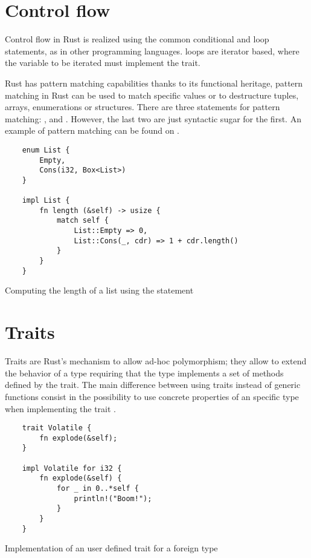 \section{Control flow}

Control flow in Rust is realized using the common  conditional
and  loop statements, as in other programming languages.
 loops are iterator based, where the variable to be iterated must
implement the  trait.

Rust has pattern matching capabilities thanks to its functional heritage,
pattern matching in Rust can be used to match specific values or to destructure
tuples, arrays, enumerations or structures. There are three statements for
pattern matching: ,  and .
However, the last two are just syntactic sugar for the first. An example of
pattern matching can be found on .

\begin{listing}[h]
	\begin{verbatim}
    enum List {
        Empty,
        Cons(i32, Box<List>)
    }

    impl List {
        fn length (&self) -> usize {
            match self {
                List::Empty => 0,
                List::Cons(_, cdr) => 1 + cdr.length()
            }
        } 
    }
    \end{verbatim}
    \caption{Computing the length of a list using the  statement}
  \label{lst:match}
\end{listing}

\section{Traits}
\label{sec:traits}

Traits are Rust's mechanism to allow ad-hoc polymorphism; they allow to extend
the behavior of a type requiring that the type implements a set of methods
defined by the trait. The main difference between using traits instead of
generic functions consist in the possibility to use concrete properties of an
specific type when implementing the trait \cite{traits}.

\begin{listing}[h]
	\begin{verbatim}
    trait Volatile {
        fn explode(&self);
    }

    impl Volatile for i32 {
        fn explode(&self) {
            for _ in 0..*self {
                println!("Boom!");
            }
        }
    }
    \end{verbatim}
  \caption{Implementation of an user defined trait for a foreign type}
  \label{lst:trait_foreign_impl}
\end{listing}

